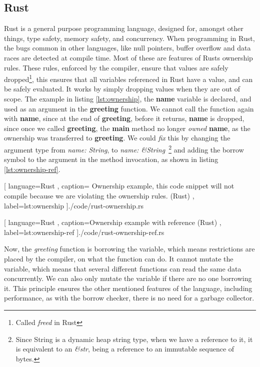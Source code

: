 \subsection{Rust}

Rust is a general purpose programming language, designed for, amongst other
things, type safety, memory safety, and concurrency. When programming in Rust,
the bugs common in other languages, like null pointers, buffer overflow and data
races are detected at compile time. Most of these are features of Rusts
ownership rules. These rules, enforced by the compiler, ensure that values are
safely dropped\footnote{Called \textit{freed} in Rust}, this ensures that all
variables referenced in Rust have a value, and can be safely evaluated. It works
by simply dropping values when they are out of scope. The example in listing
\ref{lst:ownership}, the \textbf{name} variable is declared, and used as an
argument in the \textbf{greeting} function. We cannot call the function again
with \textbf{name}, since at the end of \textbf{greeting}, before it returns,
\textbf{name} is dropped, since once we called \textbf{greeting}, the
\textbf{main} method no longer \textit{owned} \textbf{name}, as the ownership
was transferred to \textbf{greeting}. We could \textit{fix} this by changing the
argument type from \textit{name: String}, to \textit{name: \&String}~\footnote{Since String is a dynamic heap string type, when we have a reference to it, it is equivalent to an \textit{\&str}, being a reference to an immutable sequence of bytes.}
and adding the borrow symbol to the argument in
the method invocation, as shown in listing \ref{lst:ownership-ref}.

\begin{center}
  
    [ language=Rust
    , caption={
      Ownership example, this code snippet will not compile because we are
      violating the ownership rules. (Rust)
    }
    , label=lst:ownership
    ]{./code/rust-ownership.rs}
\end{center}

\begin{center}
  
    [ language=Rust
    , caption={Ownership example with reference (Rust)}
    , label=lst:ownership-ref
    ]{./code/rust-ownership-ref.rs}
\end{center}

Now, the \textit{greeting} function is borrowing the variable, which means
restrictions are placed by the compiler, on what the function can do. It cannot
mutate the variable, which means that several different functions can read the
same data concurrently. We can also only mutate the variable if there are no one
borrowing it. This principle ensures the other mentioned features of the
language, including performance, as with the borrow checker, there is no need
for a garbage collector.

